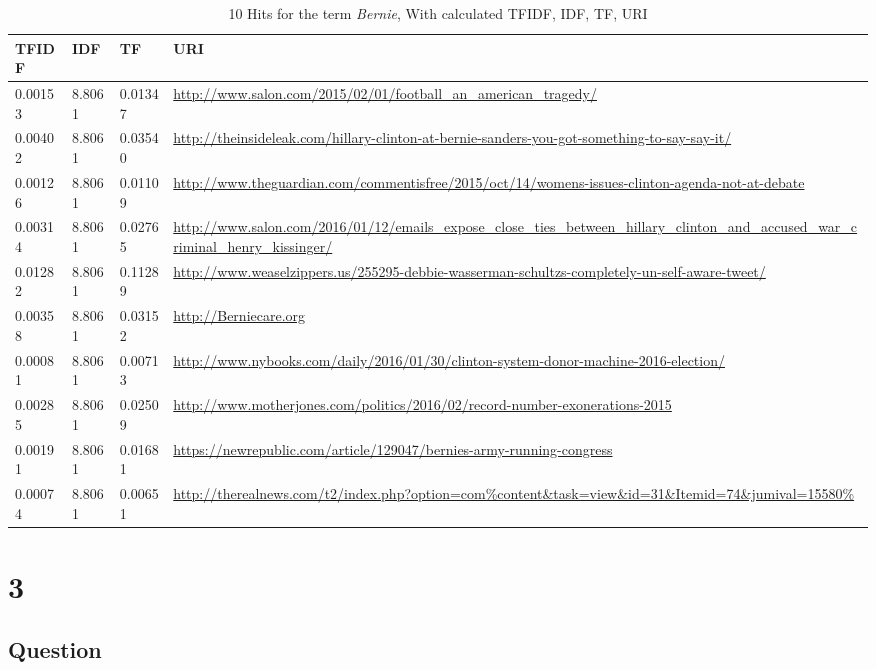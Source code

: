 \documentclass[letterpaper,10pt]{article}
\begin{document}
\begin{table}
\begin{tabular}{ | l | l | l | p{8.0cm} | }
\hline
\textbf{TFIDF} & \textbf{IDF} & \textbf{TF} & \textbf{URI} \\
\hline
0.00153 & 8.8061 & 0.01347 &  \url{http://www.salon.com/2015/02/01/football_an_american_tragedy/} \\
\hline
0.00402 & 8.8061 & 0.03540 & \url{http://theinsideleak.com/hillary-clinton-at-bernie-sanders-you-got-something-to-say-say-it/} \\
\hline
0.00126 & 8.8061 & 0.01109 & \url{http://www.theguardian.com/commentisfree/2015/oct/14/womens-issues-clinton-agenda-not-at-debate} \\
\hline
0.00314 & 8.8061 & 0.02765 & \url{http://www.salon.com/2016/01/12/emails_expose_close_ties_between_hillary_clinton_and_accused_war_criminal_henry_kissinger/} \\
\hline
0.01282 & 8.8061 & 0.11289 & \url{http://www.weaselzippers.us/255295-debbie-wasserman-schultzs-completely-un-self-aware-tweet/} \\
\hline
0.00358 & 8.8061 & 0.03152 & \url{http://Berniecare.org} \\
\hline
0.00081 & 8.8061 & 0.00713 &  \url{http://www.nybooks.com/daily/2016/01/30/clinton-system-donor-machine-2016-election/} \\
\hline
0.00285 & 8.8061 & 0.02509 & \url{http://www.motherjones.com/politics/2016/02/record-number-exonerations-2015} \\
\hline
0.00191 & 8.8061 & 0.01681 &  \url{https://newrepublic.com/article/129047/bernies-army-running-congress} \\
\hline
0.00074 & 8.8061 & 0.00651 &\url{http://therealnews.com/t2/index.php?option=com%content&task=view&id=31&Itemid=74&jumival=15580%} \\
\hline
\end{tabular}
\caption{10 Hits for the term \emph{Bernie}, With calculated TFIDF, IDF, TF, URI}
\label{table:tfidf}
\end{table}
\newpage
\section*{3}

\subsection*{Question}
\end{document}
